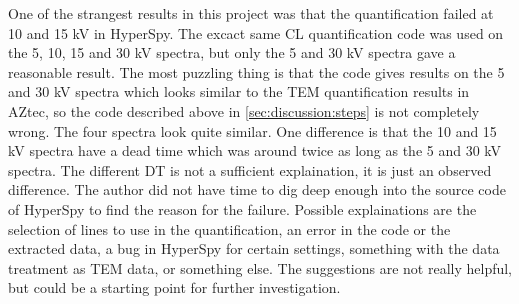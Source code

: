 One of the strangest results in this project was that the quantification failed at 10 and 15 kV in HyperSpy.
The excact same CL quantification code was used on the 5, 10, 15 and 30 kV spectra, but only the 5 and 30 kV spectra gave a reasonable result.
The most puzzling thing is that the code gives results on the 5 and 30 kV spectra which looks similar to the TEM quantification results in AZtec, so the code described above in \cref{sec:discussion:steps} is not completely wrong.
The four spectra look quite similar.
One difference is that the 10 and 15 kV spectra have a dead time which was around twice as long as the 5 and 30 kV spectra.
The different DT is not a sufficient explaination, it is just an observed difference.
The author did not have time to dig deep enough into the source code of HyperSpy to find the reason for the failure.
Possible explainations are the selection of lines to use in the quantification, an error in the code or the extracted data, a bug in HyperSpy for certain settings, something with the data treatment as TEM data, or something else.
The suggestions are not really helpful, but could be a starting point for further investigation.




















